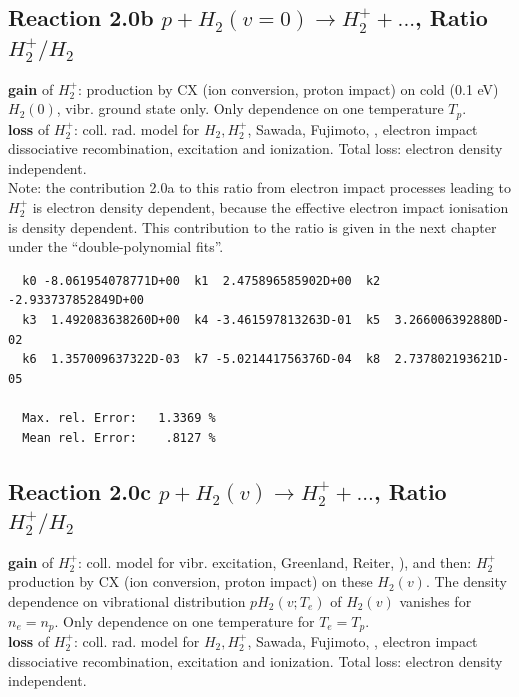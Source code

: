 \documentclass[12pt,dvipdfmx]{article}
\begin{document}
\subsection{
Reaction 2.0b     $ p + H_2(v=0) \rightarrow  H_2^+ + ... $, Ratio  \ $H_2^+/H_2$
}
\textbf{gain }of $H_2^+$:
production by CX (ion conversion, proton impact) on cold (0.1 eV) $H_2(0)$, vibr. ground state only.
Only dependence on one temperature  $T_p$.
\\
\textbf{loss }of $H_2^+$: coll. rad. model for $H_2, H_2^+$, Sawada, Fujimoto, \cite{kn:Sawada},
electron impact dissociative recombination, excitation and ionization. Total loss: electron density independent.\\

Note: the contribution 2.0a to this ratio from electron impact processes leading to $H_2^+$ is electron density dependent,
because the effective electron impact ionisation is density dependent.
This contribution to the ratio is given in the next chapter under the ``double-polynomial fits''.
\medskip


\begin{small}\begin{verbatim}
  k0 -8.061954078771D+00  k1  2.475896585902D+00  k2 -2.933737852849D+00
  k3  1.492083638260D+00  k4 -3.461597813263D-01  k5  3.266006392880D-02
  k6  1.357009637322D-03  k7 -5.021441756376D-04  k8  2.737802193621D-05

  Max. rel. Error:   1.3369 %
  Mean rel. Error:    .8127 %

\end{verbatim}\end{small}

\subsection{
Reaction 2.0c   $p + H_2(v) \rightarrow H_2^+ + ... $, Ratio  \ $H_2^+/H_2$
}
\textbf{gain }of $H_2^+$: coll. model for vibr. excitation, Greenland, Reiter, \cite{kn:Green}),
and then: $H_2^+$ production by CX (ion conversion, proton impact) on these $H_2(v)$.
The density dependence on vibrational distribution $pH_2(v;T_e)$ of $H_2(v)$ vanishes for $n_e=n_p$.
Only dependence on one temperature for $T_e=T_p$.
\\
\textbf{loss }of $H_2^+$: coll. rad. model for $H_2, H_2^+$, Sawada, Fujimoto, \cite{kn:Sawada},
electron impact dissociative recombination, excitation and ionization. Total loss: electron density independent.\\
\end{document}

